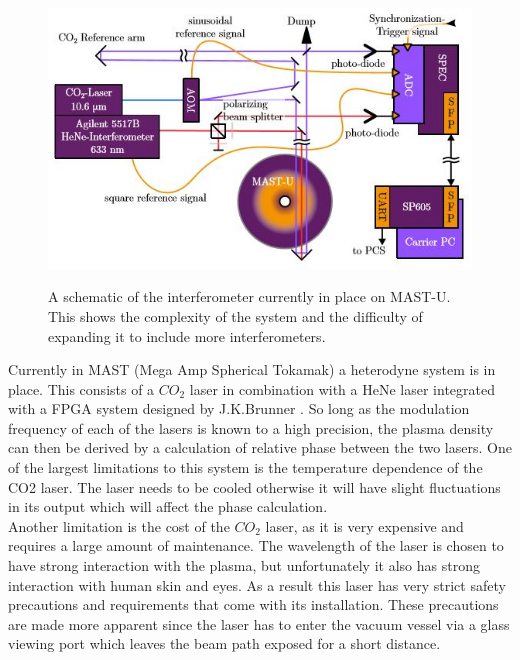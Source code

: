 \documentclass[12pt,a4paper,oneside]{report}
\begin{document}
\begin{figure}[H]
\includegraphics[width=\textwidth, center,angle=0]{Images/mastuint.JPG}
\label{MAST-U Int}
\caption{A schematic of the interferometer currently in place on MAST-U. This shows the complexity of the system and the difficulty of expanding it to include more interferometers. \cite{Brunner2017}}
\end{figure}

Currently in MAST (Mega Amp Spherical Tokamak) a heterodyne system is in place. This consists of a $CO_{2}$ laser in combination with a HeNe laser integrated with a FPGA system designed by J.K.Brunner \cite{Brunner2017}. So long as the modulation frequency of each of the lasers is known to a high precision, the plasma density can then be derived by a calculation of relative phase between the two lasers. One of the largest limitations to this system is the temperature dependence of the CO2 laser. The laser needs to be cooled otherwise it will have slight fluctuations in its output which will affect the phase calculation.\\
Another limitation is the cost of the $CO_{2}$ laser, as it is very expensive and requires a large amount of maintenance. The wavelength of the laser is chosen to have strong interaction with the plasma, but unfortunately it also has strong interaction with human skin and eyes. As a result this laser has very strict safety precautions and requirements that come with its installation. These precautions are made more apparent since the laser has to enter the vacuum vessel via a glass viewing port which leaves the beam path exposed for a short distance.
\end{document}
